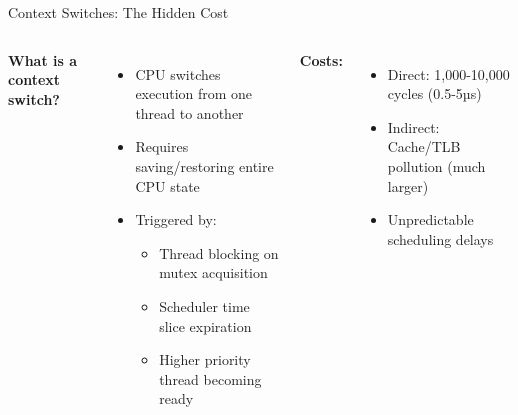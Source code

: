 \documentclass{beamer}
\begin{document}
\begin{frame}{Context Switches: The Hidden Cost}
\begin{columns}
\textbf{What is a context switch?}
\begin{itemize}
    \item CPU switches execution from one thread to another
    \item Requires saving/restoring entire CPU state
    \item Triggered by:
    \begin{itemize}
        \item Thread blocking on mutex acquisition
        \item Scheduler time slice expiration
        \item Higher priority thread becoming ready
    \end{itemize}
\end{itemize}

\textbf{Costs:}
\begin{itemize}
    \item Direct: 1,000-10,000 cycles (0.5-5µs)
    \item Indirect: Cache/TLB pollution (much larger)
    \item Unpredictable scheduling delays
\end{itemize}

\end{columns}

\end{frame}
\end{document}
